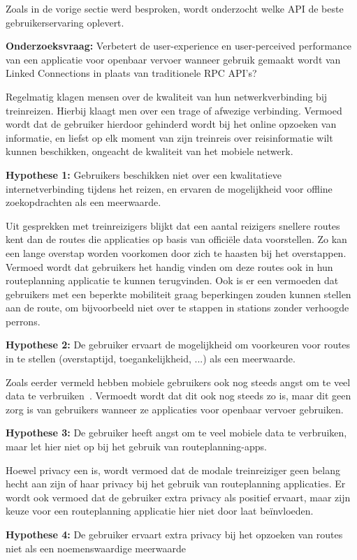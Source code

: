 Zoals in de vorige sectie werd besproken, wordt onderzocht welke API de beste gebruikerservaring oplevert.

\textbf{Onderzoeksvraag:} Verbetert de user-experience en user-perceived performance van een applicatie voor openbaar vervoer wanneer gebruik gemaakt wordt van Linked Connections in plaats van traditionele RPC API's?
 
Regelmatig klagen mensen over de kwaliteit van hun netwerkverbinding bij treinreizen. Hierbij klaagt men over een trage of afwezige verbinding. Vermoed wordt dat de gebruiker hierdoor gehinderd wordt bij het online opzoeken van informatie, en liefst op elk moment van zijn treinreis over reisinformatie wilt kunnen beschikken, ongeacht de kwaliteit van het mobiele netwerk.

\textbf{Hypothese 1:} Gebruikers beschikken niet over een kwalitatieve internetverbinding tijdens het reizen, en ervaren de mogelijkheid voor offline zoekopdrachten als een meerwaarde.
 
Uit gesprekken met treinreizigers blijkt dat een aantal reizigers snellere routes kent dan de routes die applicaties op basis van officiële data voorstellen. Zo kan een lange overstap worden voorkomen door zich te haasten bij het overstappen. Vermoed wordt dat gebruikers het handig vinden om deze routes ook in hun routeplanning applicatie te kunnen terugvinden. Ook is er een vermoeden dat gebruikers met een beperkte mobiliteit graag beperkingen zouden kunnen stellen aan de route, om bijvoorbeeld niet over te stappen in stations zonder verhoogde perrons.

\textbf{Hypothese 2:} De gebruiker ervaart de mogelijkheid om voorkeuren voor routes in te stellen (overstaptijd, toegankelijkheid, ...) als een meerwaarde.
 
Zoals eerder vermeld hebben mobiele gebruikers ook nog steeds angst om te veel data te verbruiken~\citep{ammelrooy17}. Vermoedt wordt dat dit ook nog steeds zo is, maar dit geen zorg is van gebruikers wanneer ze applicaties voor openbaar vervoer gebruiken.

\textbf{Hypothese 3:} De gebruiker heeft angst om te veel mobiele data te verbruiken, maar let hier niet op bij het gebruik van routeplanning-apps.
 
Hoewel privacy een  is, wordt vermoed dat de modale treinreiziger geen belang hecht aan zijn of haar privacy bij het gebruik van routeplanning applicaties. Er wordt ook vermoed dat de gebruiker extra privacy als positief ervaart, maar zijn keuze voor een routeplanning applicatie hier niet door laat beïnvloeden.

\textbf{Hypothese 4:} De gebruiker ervaart extra privacy bij het opzoeken van routes niet als een noemenswaardige meerwaarde